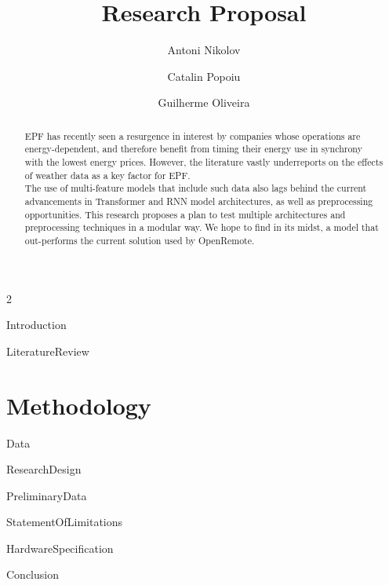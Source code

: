 \documentclass[print]{styledarticle}
\title{Research Proposal}
\author{Antoni Nikolov \and Catalin Popoiu \and Guilherme Oliveira}
\date{}
\begin{document}
\maketitle

\begin{multicols*}{2}
    \begin{abstract}
        EPF has recently seen a resurgence in interest by companies whose operations are energy-dependent, and therefore benefit from timing their energy use in synchrony with the lowest energy prices. However, the
        literature vastly underreports on the effects of weather data as a key factor for EPF.\\ The use of multi-feature models that include such data also lags behind the current advancements in Transformer and RNN model architectures,
        as well as preprocessing opportunities. This research proposes a plan to test multiple architectures and preprocessing techniques in a modular way.
        We hope to find in its midst, a model that out-performs the current solution used by OpenRemote.
    \end{abstract}

    {Introduction}

    {LiteratureReview}

    \section{Methodology}
        {Data}

        {ResearchDesign}

    {PreliminaryData}

    {StatementOfLimitations}

    {HardwareSpecification}

    {Conclusion}
\end{multicols*}



\end{document}
